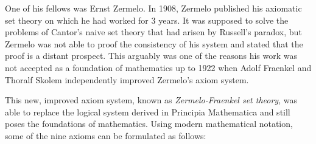 \documentclass[hidelinks]{article}
\begin{document}
One of his fellows was Ernst Zermelo. In 1908, Zermelo published his axiomatic set theory on which he had worked for 3 years. It was supposed to solve the problems of Cantor's naive set theory that had arisen by Russell's paradox, but Zermelo was not able to proof the consistency of his system and stated that the proof is a distant prospect. This arguably was one of the reasons his work was not accepted as a foundation of mathematics up to 1922 when Adolf Fraenkel and Thoralf Skolem independently improved Zermelo's axiom system. 

This new, improved axiom system, known as \textit{Zermelo-Fraenkel set theory}, was able to replace the logical system derived in Principia Mathematica and still poses the foundations of mathematics. Using modern mathematical notation, some of the nine axioms can be formulated as follows:
\small
\end{document}
